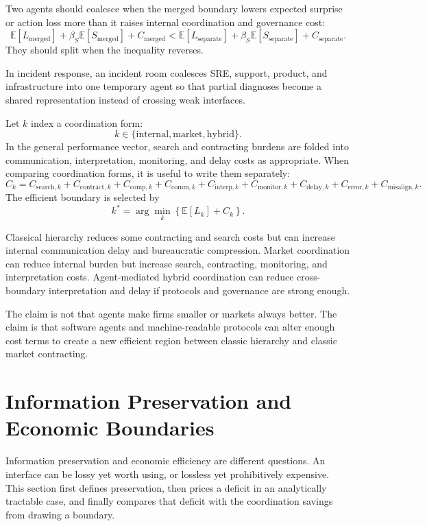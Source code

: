 \documentclass[11pt]{article}
\newcommand{\E}{\mathbb{E}}
\begin{document}
Two agents should coalesce when the merged boundary lowers expected surprise or
action loss more than it raises internal coordination and governance cost:
\[
\E[L_{\mathrm{merged}}]+\beta_S\E[S_{\mathrm{merged}}]+C_{\mathrm{merged}}
<
\E[L_{\mathrm{separate}}]+\beta_S\E[S_{\mathrm{separate}}]+C_{\mathrm{separate}}.
\]
They should split when the inequality reverses.

In incident response, an incident room coalesces SRE, support, product, and
infrastructure into one temporary agent so that partial diagnoses become a
shared representation instead of crossing weak interfaces.

Let \(k\) index a coordination form:
\[
k\in\{\mathrm{internal},\mathrm{market},\mathrm{hybrid}\}.
\]
In the general performance vector, search and contracting burdens are folded
into communication, interpretation, monitoring, and delay costs as appropriate.
When comparing coordination forms, it is useful to write them separately:
\[
C_k=C_{\mathrm{search},k}
+C_{\mathrm{contract},k}
+C_{\mathrm{comp},k}
+C_{\mathrm{comm},k}
+C_{\mathrm{interp},k}
+C_{\mathrm{monitor},k}
+C_{\mathrm{delay},k}
+C_{\mathrm{error},k}
+C_{\mathrm{misalign},k}.
\]
The efficient boundary is selected by
\[
k^*=\arg\min_k \left\{\E[L_k]+C_k\right\}.
\]

Classical hierarchy reduces some contracting and search costs but can increase
internal communication delay and bureaucratic compression. Market coordination
can reduce internal burden but increase search, contracting, monitoring, and
interpretation costs. Agent-mediated hybrid coordination can reduce
cross-boundary interpretation and delay if protocols and governance are strong
enough.

The claim is not that agents make firms smaller or markets always better. The
claim is that software agents and machine-readable protocols can alter enough
cost terms to create a new efficient region between classic hierarchy and
classic market contracting.


\section{Information Preservation and Economic Boundaries}
\label{sec:granularity}

Information preservation and economic efficiency are different questions.
An interface can be lossy yet worth using, or lossless yet prohibitively
expensive. This section first defines preservation, then prices a deficit in
an analytically tractable case, and finally compares that deficit with the
coordination savings from drawing a boundary.
\end{document}
